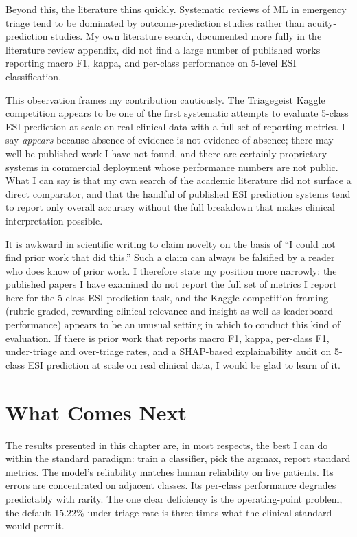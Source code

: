 Beyond this, the literature thins quickly. Systematic reviews of ML in emergency triage tend to be dominated by outcome-prediction studies rather than acuity-prediction studies. My own literature search, documented more fully in the literature review appendix, did not find a large number of published works reporting macro F1, kappa, and per-class performance on 5-level ESI classification.

This observation frames my contribution cautiously. The Triagegeist Kaggle competition appears to be one of the first systematic attempts to evaluate 5-class ESI prediction at scale on real clinical data with a full set of reporting metrics. I say \emph{appears} because absence of evidence is not evidence of absence; there may well be published work I have not found, and there are certainly proprietary systems in commercial deployment whose performance numbers are not public. What I can say is that my own search of the academic literature did not surface a direct comparator, and that the handful of published ESI prediction systems tend to report only overall accuracy without the full breakdown that makes clinical interpretation possible.

\begin{notebox}
It is awkward in scientific writing to claim novelty on the basis of ``I could not find prior work that did this.'' Such a claim can always be falsified by a reader who does know of prior work. I therefore state my position more narrowly: the published papers I have examined do not report the full set of metrics I report here for the 5-class ESI prediction task, and the Kaggle competition framing (rubric-graded, rewarding clinical relevance and insight as well as leaderboard performance) appears to be an unusual setting in which to conduct this kind of evaluation. If there is prior work that reports macro F1, kappa, per-class F1, under-triage and over-triage rates, and a SHAP-based explainability audit on 5-class ESI prediction at scale on real clinical data, I would be glad to learn of it.
\end{notebox}

\section{What Comes Next}

The results presented in this chapter are, in most respects, the best I can do within the standard paradigm: train a classifier, pick the argmax, report standard metrics. The model's reliability matches human reliability on live patients. Its errors are concentrated on adjacent classes. Its per-class performance degrades predictably with rarity. The one clear deficiency is the operating-point problem, the default $15.22\%$ under-triage rate is three times what the clinical standard would permit.

